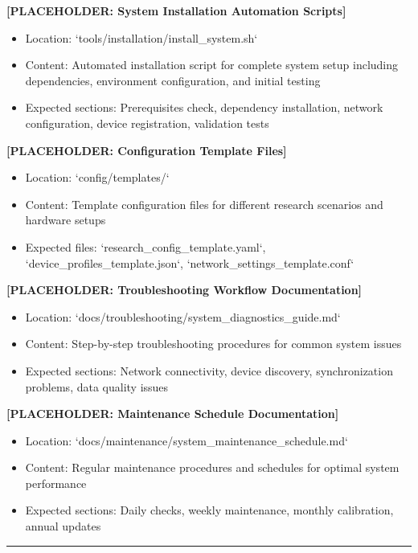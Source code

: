 \documentclass[12pt,a4paper]{article}
\begin{document}
\textbf{[PLACEHOLDER: System Installation Automation Scripts]}

\begin{itemize}
\item Location: `tools/installation/install_system.sh`
\item Content: Automated installation script for complete system setup including dependencies, environment configuration,
  and initial testing
\item Expected sections: Prerequisites check, dependency installation, network configuration, device registration,
  validation tests

\end{itemize}
\textbf{[PLACEHOLDER: Configuration Template Files]}

\begin{itemize}
\item Location: `config/templates/`
\item Content: Template configuration files for different research scenarios and hardware setups
\item Expected files: `research_config_template.yaml`, `device_profiles_template.json`, `network_settings_template.conf`

\end{itemize}
\textbf{[PLACEHOLDER: Troubleshooting Workflow Documentation]}

\begin{itemize}
\item Location: `docs/troubleshooting/system_diagnostics_guide.md`
\item Content: Step-by-step troubleshooting procedures for common system issues
\item Expected sections: Network connectivity, device discovery, synchronization problems, data quality issues

\end{itemize}
\textbf{[PLACEHOLDER: Maintenance Schedule Documentation]}

\begin{itemize}
\item Location: `docs/maintenance/system_maintenance_schedule.md`
\item Content: Regular maintenance procedures and schedules for optimal system performance
\item Expected sections: Daily checks, weekly maintenance, monthly calibration, annual updates

\end{itemize}
\hrule
\end{document}
